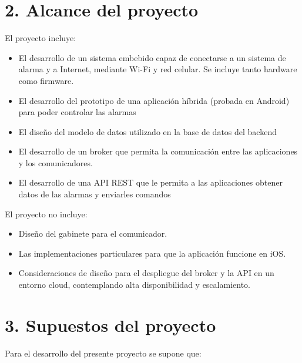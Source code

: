 \documentclass[
11pt, %
]{charter}
\begin{document}
\section{2. Alcance del proyecto}
\label{sec:alcance}


El proyecto incluye:

\begin{itemize}
	\item El desarrollo de un sistema embebido capaz de conectarse a un sistema de alarma y a Internet, mediante Wi-Fi y red celular. Se incluye tanto hardware como firmware.
	\item El desarrollo del prototipo de una aplicación híbrida (probada en Android) para poder controlar las alarmas
	\item El diseño del modelo de datos utilizado en la base de datos del backend
	\item El desarrollo de un broker que permita la comunicación entre las aplicaciones y los comunicadores.
	\item El desarrollo de una API REST que le permita a las aplicaciones obtener datos de las alarmas y enviarles comandos
\end{itemize}

El proyecto no incluye:

\begin{itemize}
	\item Diseño del gabinete para el comunicador.
	\item Las implementaciones particulares para que la aplicación funcione en iOS.
	\item Consideraciones de diseño para el despliegue del broker y la API en un entorno cloud, contemplando alta disponibilidad y escalamiento.
\end{itemize}



\section{3. Supuestos del proyecto}
\label{sec:supuestos}

Para el desarrollo del presente proyecto se supone que:
\end{document}
